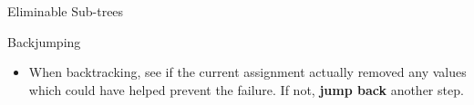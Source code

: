 \documentclass{beamer}
\begin{document}
\begin{frame}{Eliminable Sub-trees}
\begin{center}
    \end{center}

\end{frame}

\begin{frame}{Backjumping}

    \begin{itemize}
        \item When backtracking, see if the current assignment actually removed any values which
            could have helped prevent the failure. If not, \textbf{jump back} another step.
    \end{itemize}

\end{frame}
\end{document}

